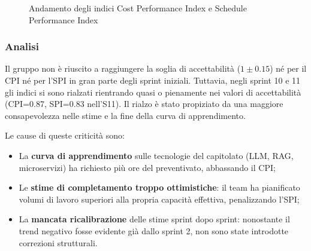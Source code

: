 \documentclass[a4paper,11pt,oneside]{scrartcl}
\begin{document}
\begin{figure}[H]
\centering
{}
\caption{Andamento degli indici Cost Performance Index e Schedule Performance Index}
\label{fig:cpi_spi}
\end{figure}

\subsubsection*{Analisi}

Il gruppo non è riuscito a raggiungere la soglia di accettabilità ($1 \pm 0.15$) né per il CPI né per l'SPI in gran parte degli sprint iniziali. Tuttavia, negli sprint 10 e 11 gli indici si sono rialzati rientrando quasi o pienamente nei valori di accettabilità (CPI=0.87, SPI=0.83 nell'S11). Il rialzo è stato propiziato da una maggiore consapevolezza nelle stime e la fine della curva di apprendimento.

Le cause di queste criticità sono:
\begin{itemize}
    \item La \textbf{curva di apprendimento} sulle tecnologie del capitolato (LLM{\scriptsize{}}, RAG{\scriptsize{}}, microservizi{\scriptsize{}}) ha richiesto più ore del preventivato, abbassando il CPI;
    \item Le \textbf{stime di completamento troppo ottimistiche}: il team ha pianificato volumi di lavoro superiori alla propria capacità effettiva, penalizzando l'SPI;
    \item La \textbf{mancata ricalibrazione} delle stime sprint dopo sprint: nonostante il trend negativo fosse evidente già dallo sprint 2, non sono state introdotte correzioni strutturali.
\end{itemize}
\end{document}
